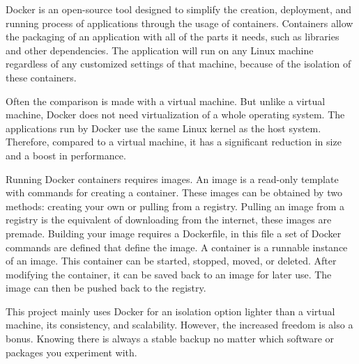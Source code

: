 Docker is an open\hyp{}source tool designed to simplify the creation, deployment, and running process of applications through the usage of containers. Containers allow the packaging of an application with all of the parts it needs, such as libraries and other dependencies. The application will run on any Linux machine regardless of any customized settings of that machine, because of the isolation of these containers. \cite{opensource_what_is_docker}

Often the comparison is made with a virtual machine. But unlike a virtual machine, Docker does not need virtualization of a whole operating system. The applications run by Docker use the same Linux kernel as the host system. Therefore, compared to a virtual machine, it has a significant reduction in size and a boost in performance. \cite{opensource_what_is_docker}

Running Docker containers requires images. An image is a read\hyp{}only template with commands for creating a container. These images can be obtained by two methods: creating your own or pulling from a registry. Pulling an image from a registry is the equivalent of downloading from the internet, these images are premade. Building your image requires a Dockerfile, in this file a set of Docker commands are defined that define the image. A container is a runnable instance of an image. This container can be started, stopped, moved, or deleted. After modifying the container, it can be saved back to an image for later use. The image can then be pushed back to the registry. \cite{docker_get_started_overview}

This project mainly uses Docker for an isolation option lighter than a virtual machine, its consistency, and scalability. However, the increased freedom is also a bonus. Knowing there is always a stable backup no matter which software or packages you experiment with.